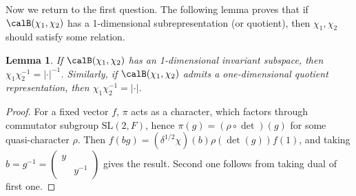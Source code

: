 \documentclass{article}
\newtheorem{lemma}{Lemma}[section]
\newcommand{\SL}{\mathrm{SL}}
\newcommand{\smat}[4]{\left(\begin{smallmatrix} #1 & #2 \\ #3 & #4 \end{smallmatrix}\right)}
\begin{document}
Now we return to the first question. The following lemma proves that if $\calB(\chi_1, \chi_2)$ has a 1-dimensional subrepresentation (or quotient), then $\chi_1, \chi_2$ should satisfy some relation. 
\begin{lemma}
If $\calB(\chi_1, \chi_2)$ has an 1-dimensional invariant subspace, then $\chi_{1}\chi_{2}^{-1} = |\cdot |^{-1}$. Similarly, if $\calB(\chi_1, \chi_2)$ admits a one-dimensional quotient representation, then $\chi_{1}\chi_{2}^{-1} = |\cdot |$. 
\end{lemma}
\begin{proof}
For a fixed vector $f$, $\pi$ acts as a character, which factors through commutator subgroup $\SL(2,F)$, hence $\pi(g) = (\rho\circ\det)(g)$ for some quasi-character $\rho$. Then $f(bg) = (\delta^{1/2} \chi)(b) \rho(\det(g)) f(1)$, and taking $b = g^{-1} =\smat{y}{}{}{y^{-1}}$ gives the result. Second one follows from taking dual of first one. 
\end{proof}
\end{document}
